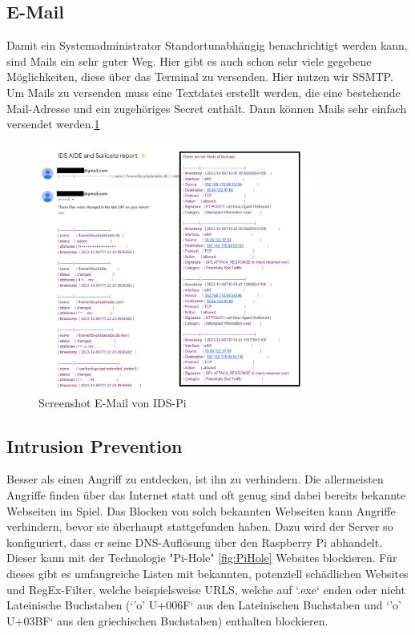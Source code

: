 \documentclass{article}
\begin{document}
\subsection{E-Mail}
Damit ein Systemadministrator Standortunabhängig benachrichtigt werden kann, sind Mails ein sehr guter Weg. Hier gibt es auch schon sehr viele gegebene Möglichkeiten, diese über das Terminal zu versenden. Hier nutzen wir SSMTP. Um Mails zu versenden muss eine Textdatei erstellt werden, die eine bestehende Mail-Adresse und ein zugehöriges Secret enthält. Dann können Mails sehr einfach versendet werden.\ref{fig:mail}
\begin{figure}[h]
    \centering
    \includegraphics[width=0.8\textwidth]{assets/mail.png}
    \caption{\label{fig:mail}Screenshot E-Mail von IDS-Pi}
\end{figure}

\vfil \break

\subsection{Intrusion Prevention}
Besser als einen Angriff zu entdecken, ist ihn zu verhindern. Die allermeisten Angriffe finden über das Internet statt und oft genug sind dabei bereits bekannte Webseiten im Spiel. Das Blocken von solch bekannten Webseiten kann Angriffe verhindern, bevor sie überhaupt stattgefunden haben. Dazu wird der Server so konfiguriert, dass er seine DNS-Auflösung über den Raspberry Pi abhandelt. Dieser kann mit der Technologie "Pi-Hole" \ref{fig:PiHole} Websites blockieren. Für dieses gibt es umfangreiche Listen mit bekannten, potenziell schädlichen Websites und RegEx-Filter, welche beispielsweise URLS, welche auf `.exe` enden oder nicht Lateinische Buchstaben (`'o' U+006F` aus den Lateinischen Buchstaben und `'o' U+03BF` aus den griechischen Buchstaben) enthalten blockieren.
\end{document}
